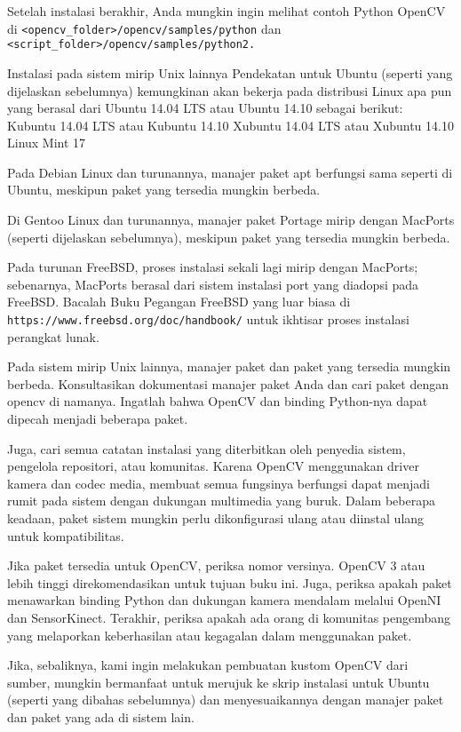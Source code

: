 \begin{enumerate}
\begin{enumerate}
Setelah instalasi berakhir, Anda mungkin ingin melihat contoh Python OpenCV di
\verb|<opencv_folder>/opencv/samples/python| dan
\verb|<script_folder>/opencv/samples/python2.|

Instalasi pada sistem mirip Unix lainnya
Pendekatan untuk Ubuntu (seperti yang dijelaskan sebelumnya) kemungkinan akan bekerja pada distribusi Linux apa pun yang berasal dari Ubuntu 14.04 LTS atau Ubuntu 14.10 sebagai berikut:
Kubuntu 14.04 LTS atau Kubuntu 14.10
Xubuntu 14.04 LTS atau Xubuntu 14.10
Linux Mint 17

Pada Debian Linux dan turunannya, manajer paket apt berfungsi sama seperti di Ubuntu, meskipun paket yang tersedia mungkin berbeda.

Di Gentoo Linux dan turunannya, manajer paket Portage mirip dengan MacPorts (seperti dijelaskan sebelumnya), meskipun paket yang tersedia mungkin berbeda.

Pada turunan FreeBSD, proses instalasi sekali lagi mirip dengan MacPorts; sebenarnya, MacPorts berasal dari sistem instalasi port yang diadopsi pada FreeBSD. Bacalah Buku Pegangan FreeBSD yang luar biasa di \verb|https://www.freebsd.org/doc/handbook/| untuk ikhtisar proses instalasi perangkat lunak.

Pada sistem mirip Unix lainnya, manajer paket dan paket yang tersedia mungkin berbeda. Konsultasikan dokumentasi manajer paket Anda dan cari paket dengan opencv di namanya. Ingatlah bahwa OpenCV dan binding Python-nya dapat dipecah menjadi beberapa
paket.

Juga, cari semua catatan instalasi yang diterbitkan oleh penyedia sistem, pengelola repositori, atau komunitas. Karena OpenCV menggunakan driver kamera dan codec media, membuat semua fungsinya berfungsi dapat menjadi rumit pada sistem dengan dukungan multimedia yang buruk. Dalam beberapa keadaan, paket sistem mungkin perlu dikonfigurasi ulang atau diinstal ulang untuk kompatibilitas.

Jika paket tersedia untuk OpenCV, periksa nomor versinya. OpenCV 3 atau lebih tinggi direkomendasikan untuk tujuan buku ini. Juga, periksa apakah paket menawarkan binding Python dan dukungan kamera mendalam melalui OpenNI dan SensorKinect. Terakhir, periksa apakah ada orang di komunitas pengembang yang melaporkan keberhasilan atau kegagalan dalam menggunakan paket.

Jika, sebaliknya, kami ingin melakukan pembuatan kustom OpenCV dari sumber, mungkin bermanfaat untuk merujuk ke skrip instalasi untuk Ubuntu (seperti yang dibahas sebelumnya) dan menyesuaikannya dengan manajer paket dan paket yang ada di sistem lain.



\end{enumerate}
\end{enumerate}
